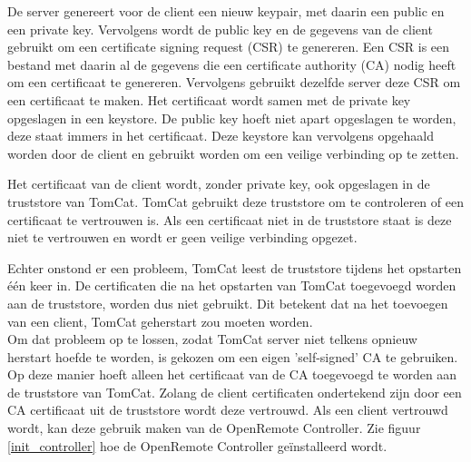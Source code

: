 \documentclass[]{article}
\begin{document}
De server genereert voor de client een nieuw keypair, met daarin een
public en een private key. Vervolgens wordt de public key en de gegevens van de
client gebruikt om een certificate signing request (CSR) te genereren. Een
CSR is een bestand met daarin al de gegevens die een certificate authority (CA)
nodig heeft om een certificaat te genereren. Vervolgens gebruikt dezelfde server
deze CSR om een certificaat te maken. Het certificaat wordt samen met de private
key opgeslagen in een keystore. De public key hoeft niet apart opgeslagen te
worden, deze staat immers in het certificaat. Deze keystore kan vervolgens
opgehaald worden door de client en gebruikt worden om een veilige verbinding op
te zetten.

Het certificaat van de client wordt, zonder private key, ook opgeslagen in de
truststore van TomCat. TomCat gebruikt deze truststore om te controleren of een
certificaat te vertrouwen is. Als een certificaat niet in de truststore staat
is deze niet te vertrouwen en wordt er geen veilige verbinding opgezet. 

Echter onstond er een probleem, TomCat leest de truststore tijdens het opstarten
\'e\'en keer in. De certificaten die na het opstarten van TomCat toegevoegd
worden aan de truststore, worden dus niet gebruikt. Dit betekent dat na het
toevoegen van een client, TomCat geherstart zou moeten  worden. 
\\Om dat probleem op te lossen, zodat TomCat server niet
telkens opnieuw herstart hoefde te worden, is gekozen om een eigen
'self-signed' CA te gebruiken. Op deze manier hoeft alleen het certificaat van
de CA toegevoegd te worden aan de truststore van TomCat.  Zolang de client
certificaten ondertekend zijn door een CA certificaat uit de
truststore wordt deze vertrouwd. Als een client vertrouwd wordt, kan deze
gebruik maken van de OpenRemote Controller. Zie figuur \ref{init_controller} hoe
de OpenRemote Controller ge\"installeerd wordt.

\newpage
\end{document}
